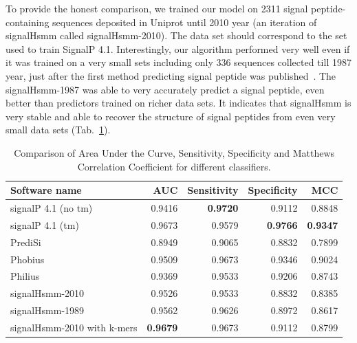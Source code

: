 \documentclass[10pt,letterpaper]{article}
\begin{document}
To provide the honest comparison, we trained our model on 2311 signal peptide-containing sequences deposited in Uniprot until 2010 year (an iteration of signalHsmm called signalHsmm-2010). The data set should correspond to the set used to train SignalP 4.1. Interestingly, our algorithm performed very well even if it was trained on a very small sets including only 336 sequences collected till 1987 year, just after the first method predicting signal peptide was published~\cite{1986vonheijnea}. The signalHsmm-1987 was able to very accurately predict a signal peptide, even better than predictors trained on richer data sets. It indicates that signalHsmm is very stable and able to recover the structure of signal peptides from even very small data sets (Tab.~\ref{tab:bench2010}).

\begin{table}[ht]
\small
\centering
\caption{Comparison of Area Under the Curve, Sensitivity, Specificity and Matthews Correlation Coefficient for different classifiers.} 
\begin{tabular}{lrrrr}
  \toprule
Software name & AUC & Sensitivity & Specificity & MCC \\ 
  \midrule
signalP 4.1 (no tm) \cite{2011petersensignalp} & 0.9416 & \textbf{0.9720} & 0.9112 & 0.8848 \\ 
   \rowcolor[gray]{0.85}signalP 4.1 (tm) \cite{2011petersensignalp} & 0.9673 & 0.9579 & \textbf{0.9766} & \textbf{0.9347} \\ 
  PrediSi \cite{2004hillerpredisi} & 0.8949 & 0.9065 & 0.8832 & 0.7899 \\ 
   \rowcolor[gray]{0.85}Phobius \cite{2004klla} & 0.9509 & 0.9673 & 0.9346 & 0.9024 \\ 
  Philius \cite{2008reynoldstransmembrane} & 0.9369 & 0.9533 & 0.9206 & 0.8743 \\ 
   \rowcolor[gray]{0.85}signalHsmm-2010 & 0.9526 & 0.9533 & 0.8832 & 0.8385 \\ 
  signalHsmm-1989 & 0.9562 & 0.9626 & 0.8972 & 0.8617 \\ 
   \rowcolor[gray]{0.85}signalHsmm-2010 with k-mers & \textbf{0.9679} & 0.9673 & 0.9112 & 0.8799 \\ 
   \bottomrule
\end{tabular}
\label{tab:bench2010}
\end{table}
\end{document}
